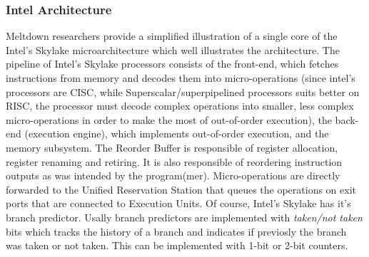 \subsubsection{Intel Architecture}
Meltdown researchers provide a simplified illustration of a single core of the Intel's Skylake microarchitecture which
well illustrates the architecture.
The pipeline of Intel's Skylake processors consists of the front-end, which fetches instructions from memory and decodes them into micro-operations
(since intel's processors are CISC, while Superscalar/superpipelined processors suits better on RISC, the processor must decode complex operations
into smaller, less complex micro-operations in order to make the most of out-of-order execution), the back-end (execution engine), which implements
out-of-order execution, and the memory subsystem.
The Reorder Buffer is responsible of register allocation, register renaming and retiring. It is also responsible of reordering instruction outputs
as was intended by the program(mer).
Micro-operations are directly forwarded to the Unified Reservation Station that queues the operations on exit ports that are connected to Execution Units.
Of course, Intel's Skylake has it's branch predictor. Usally branch predictors are implemented with \textit{taken/not taken} bits which tracks the history
of a branch and indicates if previosly the branch was taken or not taken. This can be implemented with 1-bit or 2-bit counters.

